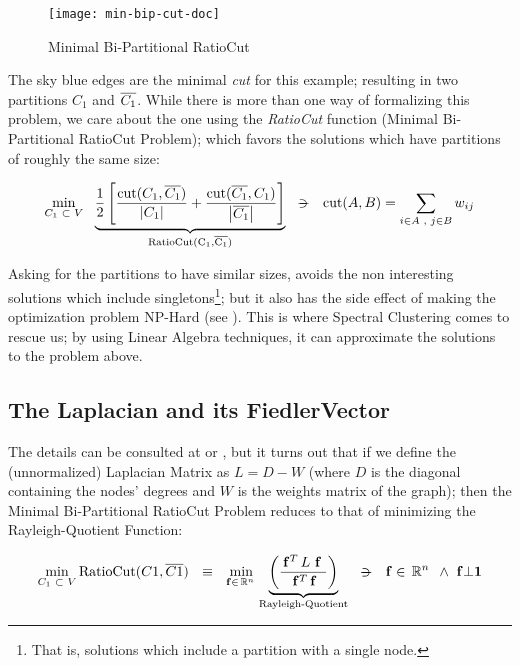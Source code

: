 \begin{figure}[H]
  \label{min-bip-cut}
  \centering
  \caption{Minimal Bi-Partitional RatioCut}  
  \texttt{[image: min-bip-cut-doc]}
\end{figure}

The sky blue edges are the minimal \emph{cut} for this example; resulting
in two partitions $C_1$ and $\overline{C_1}$. While there is more than
one way of formalizing this problem, we care about the one
using the \emph{RatioCut} function (Minimal Bi-Partitional RatioCut Problem);
which favors the solutions which have partitions of roughly
the same size: 

\begin{equation*}
  \min\limits_{\tiny{C_1 \ds{\subset} V}} \ds{}
  \underbrace{      
    \frac{1}{2}
    \left[
      \dfrac{\func{cut}(C_1,\stcomp{C_1})}{\abs{C_1}} +
      \dfrac{\func{cut}(\stcomp{C_1},C_1)}{\abs{\stcomp{C_1}}}
      \right]
  }_{\func{RatioCut(C_1,\stcomp{C_1})}}
  \ds{\suchthat}
  \func{cut}(A,B) = \sum\limits_{\tiny{i \in A \ds{,} j \in B}} w_{ij}
\end{equation*}
\joinbelow{1cm}

Asking for the partitions to have similar sizes, avoids the non
interesting solutions which include singletons\footnote{That is,
  solutions which include a partition with a single node.}; but it also  
has the side effect of making the optimization problem NP-Hard (see
\cite{wagner93}). This 
is where Spectral Clustering comes to rescue us; by using Linear
Algebra techniques, it can approximate the solutions to the problem
above.

\subsection{The \gls{Laplacian} and its \gls{FiedlerVector}}
The details can be consulted at \cite{luxburg07} or
\cite{gao13}, but it turns out that if we define the (unnormalized)
\gls{Laplacian} Matrix as $L = D - W$ (where $D$ is the diagonal containing
the nodes' degrees and $W$ is the weights matrix of the graph); then
the Minimal Bi-Partitional RatioCut Problem reduces to that of minimizing the
Rayleigh-Quotient Function:

\begin{equation*}
\min\limits_{C_1 \ds{\subset} V} \func{RatioCut}(C1,\stcomp{C1})
\ds{\ds{\equiv}}
\min\limits_{\vec{f} \in \R{n}}
  \underbrace{
    \left(\dfrac{\trans{\vec{f}} L \ds{\vec{f}}}{\trans{\vec{f}} \vec{f}}\right)
  }_{\text{Rayleigh-Quotient}}    
\ds{\suchthat}
\vec{f} \in \R{n} \ds{\land} \vec{f} \bot \vec{1}
\end{equation*}
\joinbelow{1cm}

